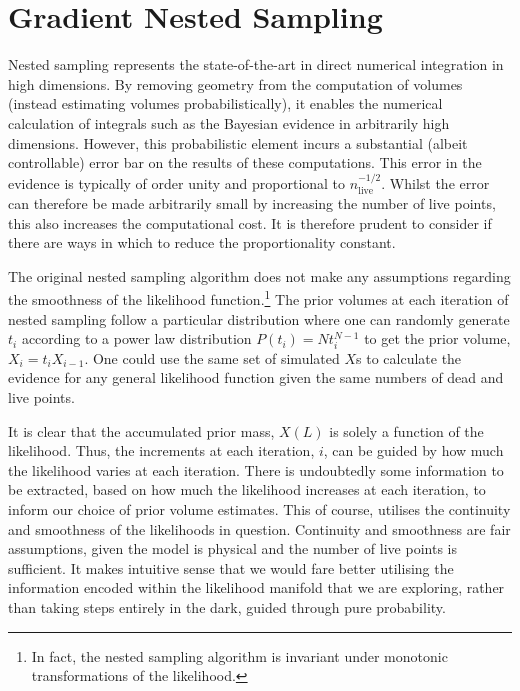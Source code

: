 
\chapter{Gradient Nested Sampling}\label{ch:chapter2}

\ifpdf
    \graphicspath{{Chapter2/Figs/Raster/}{Chapter2/Figs/PDF/}{Chapter2/Figs/}}
\else
    \graphicspath{{Chapter2/Figs/Vector/}{Chapter2/Figs/}}
\fi

Nested sampling represents the state-of-the-art in direct numerical integration in high dimensions. By removing geometry from the computation of volumes (instead estimating volumes probabilistically), it enables the numerical calculation of integrals such as the Bayesian evidence in arbitrarily high dimensions. However, this probabilistic element incurs a substantial (albeit controllable) error bar on the results of these computations. This error in the evidence is typically of order unity and proportional to $n_\mathrm{live}^{-1/2}$. Whilst the error can therefore be made arbitrarily small by increasing the number of live points, this also increases the computational cost. It is therefore prudent to consider if there are ways in which to reduce the proportionality constant.

The original nested sampling algorithm does not make any assumptions regarding the smoothness of the likelihood function.\footnote{In fact, the nested sampling algorithm is invariant under monotonic transformations of the likelihood.} The prior volumes at each iteration of nested sampling follow a particular distribution where one can randomly generate $t_i$ according to a power law distribution $P(t_i)= N t_i^{N-1}$ to get the prior volume, $X_{i}=t_iX_{i-1}$. One could use the same set of simulated $X$s to calculate the evidence for any general likelihood function given the same numbers of dead and live points. 

It is clear that the accumulated prior mass, $X(L)$ is solely a function of the likelihood. Thus, the increments at each iteration, $i$, can be guided by how much the likelihood varies at each iteration. There is undoubtedly some information to be extracted, based on how much the likelihood increases at each iteration, to inform our choice of prior volume estimates. This of course, utilises the continuity and smoothness of the likelihoods in question. Continuity and smoothness are fair assumptions, given the model is physical and the number of live points is sufficient. It makes intuitive sense that we would fare better utilising the information encoded within the likelihood manifold that we are exploring, rather than taking steps entirely in the dark, guided through pure probability.

